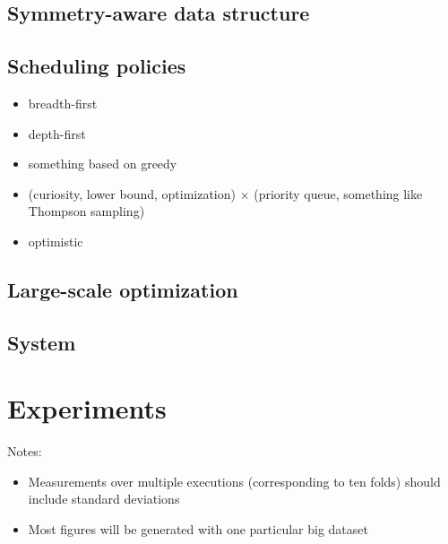 \subsection{Symmetry-aware data structure}

\subsection{Scheduling policies}

\begin{itemize}
\item breadth-first
\item depth-first
\item something based on greedy
\item (curiosity, lower bound, optimization) $\times$ (priority queue, something like Thompson sampling)
\item optimistic
\end{itemize}

\subsection{Large-scale optimization}

\subsection{System}

\section{Experiments}

Notes:
\begin{itemize}

\item Measurements over multiple executions (corresponding to ten folds)
should include standard deviations

\item Most figures will be generated with one particular big dataset
\end{itemize}

